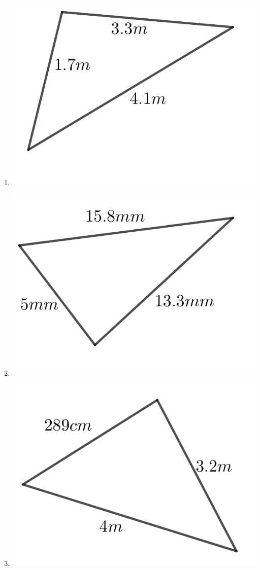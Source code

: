 \begin{multicols}{2}
\begin{enumerate}
	\item \includegraphics{./Images/Measurement/perimeter6.png}
	\item \includegraphics{./Images/Measurement/perimeter7.png}
	\item \includegraphics{./Images/Measurement/perimeter8.png}

\end{enumerate}
\end{multicols}
